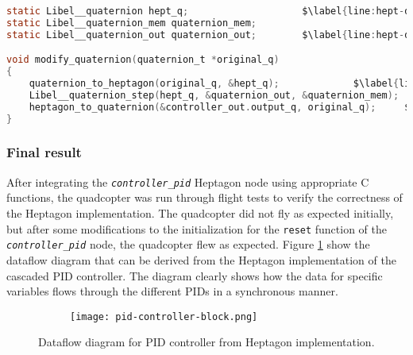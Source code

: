 \documentclass[10pt, a4paper]{article}
\newcommand{\textFunc}[1]{\texttt{\textit{#1}}}
\newcommand{\code}[1]{\texttt{#1}}
\begin{document}
    \bigskip
    \begin{lstlisting}[caption={Calling \textFunc{quaternion} node from original firmware}, label={listing:Heptagon-c-code-integration}, language=C]
static Libel__quaternion hept_q;                    $\label{line:hept-def-start}$
static Libel__quaternion_mem quaternion_mem;
static Libel__quaternion_out quaternion_out;        $\label{line:hept-def-end}$

void modify_quaternion(quaternion_t *original_q)
{
    quaternion_to_heptagon(original_q, &hept_q);             $\label{line:heptagon-convert}$
    Libel__quaternion_step(hept_q, &quaternion_out, &quaternion_mem);
    heptagon_to_quaternion(&controller_out.output_q, original_q);     $\label{line:heptagon-output-out}$
}   \end{lstlisting}
    \bigskip

    \subsubsection{Final result}    
    After integrating the \textFunc{controller\_pid} Heptagon node using appropriate C functions, the quadcopter was run through flight tests to verify the correctness of the Heptagon implementation. The quadcopter did not fly as expected initially, but after some modifications to the initialization for the \code{reset} function of the \textFunc{controller\_pid} node, the quadcopter flew as expected. Figure \ref{figure:pid-controller-block} show the dataflow diagram that can be derived from the Heptagon implementation of the cascaded PID controller. The diagram clearly shows how the data for specific variables flows through the different PIDs in a synchronous manner.

    \begin{figure}[hbt!]
        \centering
        \begin{subfigure}[b]{0.99\textwidth}
            \centering
            \texttt{[image: pid-controller-block.png]}
        \end{subfigure}
        \caption{Dataflow diagram for PID controller from Heptagon implementation.}
        \label{figure:pid-controller-block}
    \end{figure}
\end{document}
